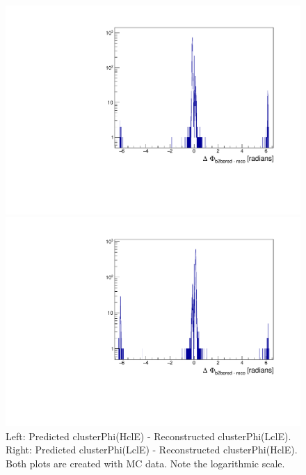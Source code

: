 \documentclass[a4paper,11pt,twosided,final,german,openbib,pdftex,listof=totoc,bibliography=totoc]{scrbook}
\begin{document}
\begin{appendix}
\begin{figure}[h!]
	\centering
	\begin{minipage}[b]{0.45\linewidth}
		\centering
		\includegraphics[width=\textwidth]{AnhangPlots/b2b_ProbeTag_Data_Whole.pdf}
	\end{minipage}
	\hspace{0.5cm}
	\begin{minipage}[b]{0.45\linewidth}
		\centering
		\includegraphics[width=\textwidth]{AnhangPlots/b2b_TagProbe_Data_Whole.pdf}
	\end{minipage}
	\caption[b2bClusterPhi - clusterPhi For MC (Whole Range)]{Left: Predicted clusterPhi(HclE) - Reconstructed clusterPhi(LclE). Right: Predicted clusterPhi(LclE) - Reconstructed clusterPhi(HclE). Both plots are created with MC data. Note the logarithmic scale.}
	\label{fig:b2bMC_Whole}
\end{figure}








\end{appendix}
\end{document}
